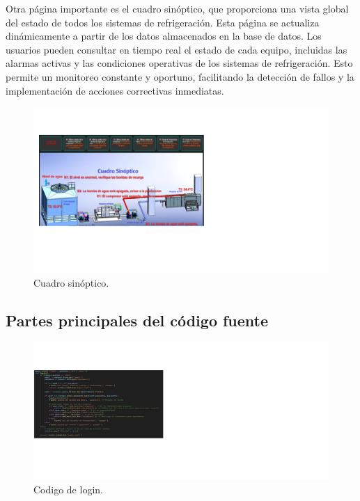 Otra página importante es el cuadro sinóptico, que proporciona una vista global del estado de todos los sistemas de refrigeración. Esta página se actualiza dinámicamente a partir de los datos almacenados en la base de datos. Los usuarios pueden consultar en tiempo real el estado de cada equipo, incluidas las alarmas activas y las condiciones operativas de los sistemas de refrigeración. Esto permite un monitoreo constante y oportuno, facilitando la detección de fallos y la implementación de acciones correctivas inmediatas.\\

\begin{figure}[H]
\begin{center}
\includegraphics[scale = 0.9]{./images/cuadro sinoptico.png}
\caption{Cuadro sinóptico.}
\label{fig:huella}
\end{center}
\end{figure}

\subsection{Partes principales del código fuente}

\begin{figure}[H]
\begin{center}
\includegraphics[scale = 0.8]{./images/codigo de login.png}
\caption{Codigo de login.}
\label{fig:huella}
\end{center}
\end{figure}

